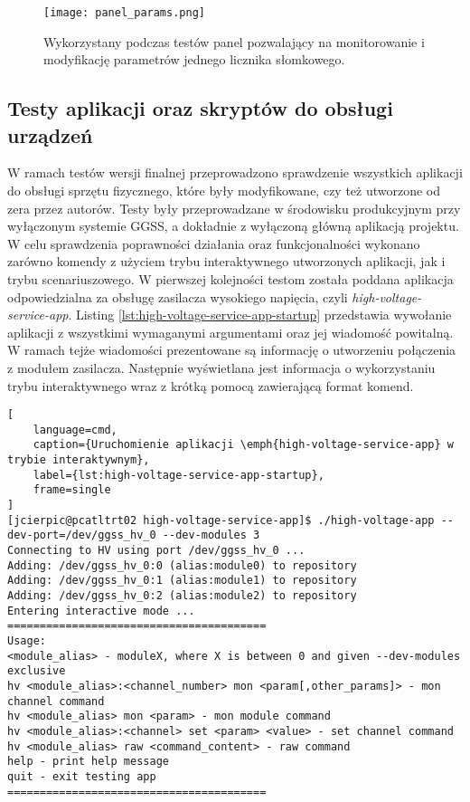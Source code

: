 \clearpage
\begin{figure}[H]
    \centering
    \texttt{[image: panel\_params.png]}
    \caption{Wykorzystany podczas testów panel pozwalający na monitorowanie i modyfikację parametrów jednego licznika słomkowego.}
    \label{fig:panel-params}
\end{figure}


\subsection{Testy aplikacji oraz skryptów do obsługi urządzeń}

W ramach testów wersji finalnej przeprowadzono sprawdzenie wszystkich aplikacji do obsługi sprzętu fizycznego, które były modyfikowane, czy też utworzone od zera przez autorów. Testy były przeprowadzane w środowisku produkcyjnym przy wyłączonym systemie GGSS, a dokładnie z wyłączoną główną aplikacją projektu. W celu sprawdzenia poprawności działania oraz funkcjonalności wykonano zarówno komendy z użyciem trybu interaktywnego utworzonych aplikacji, jak i trybu scenariuszowego. W pierwszej kolejności testom została poddana aplikacja odpowiedzialna za obsługę zasilacza wysokiego napięcia, czyli \emph{high-voltage-service-app}. Listing \ref{lst:high-voltage-service-app-startup} przedstawia wywołanie aplikacji z wszystkimi wymaganymi argumentami oraz jej wiadomość powitalną. W ramach tejże wiadomości prezentowane są informację o utworzeniu połączenia z modułem zasilacza. Następnie wyświetlana jest informacja o wykorzystaniu trybu interaktywnego wraz z krótką pomocą zawierającą format komend.

\clearpage
\begin{lstlisting}[
    language=cmd,
    caption={Uruchomienie aplikacji \emph{high-voltage-service-app} w trybie interaktywnym},
    label={lst:high-voltage-service-app-startup},
    frame=single
]
[jcierpic@pcatltrt02 high-voltage-service-app]$ ./high-voltage-app --dev-port=/dev/ggss_hv_0 --dev-modules 3
Connecting to HV using port /dev/ggss_hv_0 ...
Adding: /dev/ggss_hv_0:0 (alias:module0) to repository
Adding: /dev/ggss_hv_0:1 (alias:module1) to repository
Adding: /dev/ggss_hv_0:2 (alias:module2) to repository
Entering interactive mode ...
========================================
Usage:
<module_alias> - moduleX, where X is between 0 and given --dev-modules exclusive
hv <module_alias>:<channel_number> mon <param[,other_params]> - mon channel command
hv <module_alias> mon <param> - mon module command
hv <module_alias>:<channel> set <param> <value> - set channel command
hv <module_alias> raw <command_content> - raw command
help - print help message
quit - exit testing app
========================================
\end{lstlisting}

